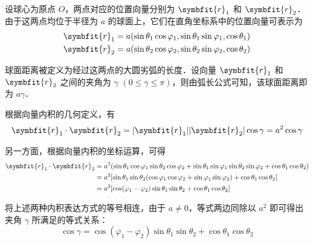 \begin{myproof}
    设球心为原点 $O$，两点对应的位置向量分别为 $\symbfit{r}_1$ 和 $\symbfit{r}_2$．由于这两点均位于半径为 $a$ 的球面上，它们在直角坐标系中的位置向量可表示为
    \begin{equation}
        \begin{aligned}
            \symbfit{r}_1 & = a (\sin\theta_1 \cos\varphi_1, \sin\theta_1 \sin\varphi_1, \cos\theta_1) \\
            \symbfit{r}_2 & = a (\sin\theta_2 \cos\varphi_2, \sin\theta_2 \sin\varphi_2, \cos\theta_2)
        \end{aligned}
    \end{equation}

    球面距离被定义为经过这两点的大圆劣弧的长度．设向量 $\symbfit{r}_1$ 和 $\symbfit{r}_2$ 之间的夹角为 $\gamma$ $(0 \le \gamma \le \pi)$，则由弧长公式可知，该球面距离即为 $a\gamma$．

    根据向量内积的几何定义，有
    \begin{equation}
        \symbfit{r}_1 \cdot \symbfit{r}_2 = |\symbfit{r}_1| |\symbfit{r}_2| \cos\gamma = a^2 \cos\gamma
    \end{equation}

    另一方面，根据向量内积的坐标运算，可得
    \begin{equation}
        \begin{aligned}
            \symbfit{r}_1 \cdot \symbfit{r}_2 & = a^2 (\sin\theta_1 \cos\varphi_1 \sin\theta_2 \cos\varphi_2 + \sin\theta_1 \sin\varphi_1 \sin\theta_2 \sin\varphi_2 + \cos\theta_1 \cos\theta_2) \\
                                              & = a^2 [\sin\theta_1 \sin\theta_2 (\cos\varphi_1 \cos\varphi_2 + \sin\varphi_1 \sin\varphi_2) + \cos\theta_1 \cos\theta_2]                         \\
                                              & = a^2 [\cos(\varphi_1 - \varphi_2) \sin\theta_1 \sin\theta_2 + \cos\theta_1 \cos\theta_2]
        \end{aligned}
    \end{equation}

    将上述两种内积表达方式的等号相连，由于 $a \neq 0$，等式两边同除以 $a^2$ 即可得出夹角 $\gamma$ 所满足的等式关系：
    \begin{equation}
        \boxed{\cos\gamma = \cos(\varphi_1 - \varphi_2) \sin\theta_1 \sin\theta_2 + \cos\theta_1 \cos\theta_2}
    \end{equation}
\end{myproof}

\endinput
